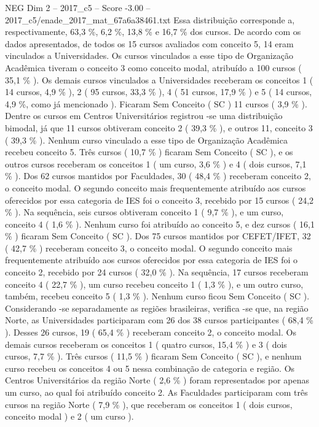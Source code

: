 \begin{textsample}{NEG Dim 2 – 2017\_c5 – Score -3.00 – 2017\_c5/enade\_2017\_mat\_67a6a38461.txt}
Essa distribuição corresponde a, respectivamente, 63,3 \%, 6,2 \%, 13,8 \% e 16,7 \% dos cursos.
De acordo com os dados apresentados, de todos os 15 cursos avaliados com conceito 5, 14 eram vinculados a Universidades.
Os cursos vinculados a esse tipo de Organização Acadêmica tiveram o conceito 3 como conceito modal, atribuído a 100 cursos ( 35,1 \% ).
Os demais cursos vinculados a Universidades receberam os conceitos 1 ( 14 cursos, 4,9 \% ), 2 ( 95 cursos, 33,3 \% ), 4 ( 51 cursos, 17,9 \% ) e 5 ( 14 cursos, 4,9 \%, como já mencionado ).
Ficaram Sem Conceito ( SC ) 11 cursos ( 3,9 \% ).
Dentre os cursos em Centros Universitários registrou -se uma distribuição bimodal, já que 11 cursos obtiveram conceito 2 ( 39,3 \% ), e outros 11, conceito 3 ( 39,3 \% ).
Nenhum curso vinculado a esse tipo de Organização Acadêmica recebeu conceito 5.
Três cursos ( 10,7 \% ) ficaram Sem Conceito ( SC ), e os outros cursos receberam os conceitos 1 ( um curso, 3,6 \% ) e 4 ( dois cursos, 7,1 \% ).
Dos 62 cursos mantidos por Faculdades, 30 ( 48,4 \% ) receberam conceito 2, o conceito modal.
O segundo conceito mais frequentemente atribuído aos cursos oferecidos por essa categoria de IES foi o conceito 3, recebido por 15 cursos ( 24,2 \% ).
Na sequência, seis cursos obtiveram conceito 1 ( 9,7 \% ), e um curso, conceito 4 ( 1,6 \% ).
Nenhum curso foi atribuído ao conceito 5, e dez cursos ( 16,1 \% ) ficaram Sem Conceito ( SC ).
Dos 75 cursos mantidos por CEFET/IFET, 32 ( 42,7 \% ) receberam conceito 3, o conceito modal.
O segundo conceito mais frequentemente atribuído aos cursos oferecidos por essa categoria de IES foi o conceito 2, recebido por 24 cursos ( 32,0 \% ).
Na sequência, 17 cursos receberam conceito 4 ( 22,7 \% ), um curso recebeu conceito 1 ( 1,3 \% ), e um outro curso, também, recebeu conceito 5 ( 1,3 \% ).
Nenhum curso ficou Sem Conceito ( SC ).
Considerando -se separadamente as regiões brasileiras, verifica -se que, na região Norte, as Universidades participaram com 26 dos 38 cursos participantes ( 68,4 \% ).
Desses 26 cursos, 19 ( 65,4 \% ) receberam conceito 2, o conceito modal.
Os demais cursos receberam os conceitos 1 ( quatro cursos, 15,4 \% ) e 3 ( dois cursos, 7,7 \% ).
Três cursos ( 11,5 \% ) ficaram Sem Conceito ( SC ), e nenhum curso recebeu os conceitos 4 ou 5 nessa combinação de categoria e região.
Os Centros Universitários da região Norte ( 2,6 \% ) foram representados por apenas um curso, ao qual foi atribuído conceito 2.
As Faculdades participaram com três cursos na região Norte ( 7,9 \% ), que receberam os conceitos 1 ( dois cursos, conceito modal ) e 2 ( um curso ).

\end{textsample}
